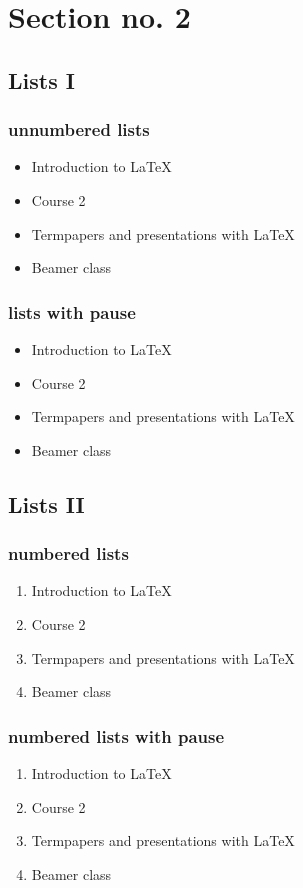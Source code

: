 \documentclass[11pt]{beamer}
\begin{document}
    \section{Section no. 2}
    \subsection{Lists I}
    \begin{frame}\frametitle{unnumbered lists}
        \begin{itemize}
            \item Introduction to  \LaTeX
            \item Course 2
            \item Termpapers and presentations with \LaTeX
            \item Beamer class
        \end{itemize}
    \end{frame}

    \begin{frame}\frametitle{lists with pause}
        \begin{itemize}
            \item Introduction to  \LaTeX \pause
            \item Course 2 \pause
            \item Termpapers and presentations with \LaTeX \pause
            \item Beamer class
        \end{itemize}
    \end{frame}

    \subsection{Lists II}
    \begin{frame}\frametitle{numbered lists}
        \begin{enumerate}
            \item Introduction to  \LaTeX
            \item Course 2
            \item Termpapers and presentations with \LaTeX
            \item Beamer class
        \end{enumerate}
    \end{frame}

    \begin{frame}\frametitle{numbered lists with pause}
        \begin{enumerate}
            \item Introduction to  \LaTeX \pause
            \item Course 2 \pause
            \item Termpapers and presentations with \LaTeX \pause
            \item Beamer class
        \end{enumerate}
    \end{frame}
\end{document}
